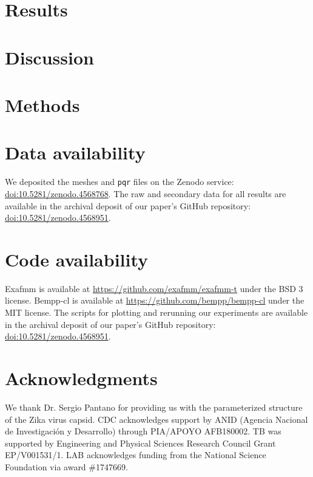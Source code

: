 \documentclass[twocolumn]{article}
\begin{document}
\section{Results}\label{sec:results}


\section{Discussion} \label{sec:discussion}


\small{
\section{Methods}\label{sec:methods}



}

\section{Data availability}
We deposited the meshes and \texttt{pqr} files on the Zenodo service: \href{http://doi.org/10.5281/zenodo.4568768}{doi:10.5281/zenodo.4568768}.
The raw and secondary data for all results are available in the archival deposit of our paper’s GitHub repository: \href{http://doi.org/10.5281/zenodo.4568951}{doi:10.5281/zenodo.4568951}.

\section{Code availability}
Exafmm is available at \href{https://github.com/exafmm/exafmm-t}{https://github.com/exafmm/exafmm-t} under the BSD 3 license.
Bempp-cl is available at \href{https://github.com/bempp/bempp-cl}{https://github.com/bempp/bempp-cl} under the MIT license.
The scripts for plotting and rerunning our experiments are available in the archival deposit of our paper’s GitHub repository: \href{http://doi.org/10.5281/zenodo.4568951}{doi:10.5281/zenodo.4568951}.

{}


\section*{Acknowledgments}
We thank Dr. Sergio Pantano for providing us with the parameterized structure of the Zika virus capsid.
CDC acknowledges support by ANID (Agencia Nacional de Investigaci\'{o}n y Desarrollo) through PIA/APOYO AFB180002.
TB was supported by Engineering and Physical Sciences Research Council Grant EP/V001531/1.
LAB acknowledges funding from the National Science Foundation via award \#1747669.
\end{document}
